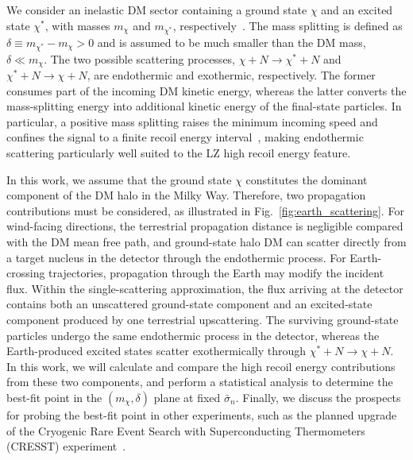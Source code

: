 \documentclass[aps,twocolumn,prl,showpacs,showkeys,preprintnumbers,superscriptaddress,nobibnotes,floatfix,nofootinbib]{revtex4-2}
\begin{document}
We consider an inelastic DM sector containing a ground state  $\chi$ and an excited state $\chi^\ast$, with masses $m_\chi$ and $m_{\chi^\ast}$, respectively~\cite{Tucker-Smith:2001myb,Tucker-Smith:2004mxa,Chang:2008gd,Cui:2009xq,Graham:2010ca,Barello:2014uda,Blennow:2015hzp,PandaX-II:2017zex,Baryakhtar:2020rwy,He:2020wjs,Choi:2020ysq,Bell:2021xff,Song:2021yar,Li:2022acp,XENON:2022avm,Eby:2023wem,Garcia:2024uwf}. The mass splitting is defined as $\delta \equiv m_{\chi^\ast}-m_\chi > 0$ and is assumed to be much smaller than the DM mass, $\delta \ll m_{\chi}$. The two possible scattering processes, $\chi+N\rightarrow\chi^\ast+N$ and $\chi^\ast+N\rightarrow\chi+N$, are endothermic and exothermic, respectively. The former consumes part of the incoming DM kinetic energy, whereas the latter converts the mass-splitting energy into additional kinetic energy of the final-state particles. In particular, a positive mass splitting raises the minimum incoming speed and confines the signal to a finite recoil energy interval~\cite{Bramante:2016rdh,PICO:2023uff,An:2025bby,Alloni:2026xdf}, making endothermic scattering particularly well suited to the LZ high recoil energy feature.

In this work, we assume that the ground state $\chi$ constitutes the dominant component of the DM halo in the Milky Way.  Therefore, two propagation contributions must be considered, as illustrated in Fig.~\ref{fig:earth_scattering}. For wind-facing directions, the terrestrial propagation distance is negligible compared with the DM mean free path, and ground-state halo DM can scatter directly from a target nucleus in the detector through the endothermic process. For Earth-crossing trajectories, propagation through the Earth may modify the incident flux. Within the single-scattering approximation, the flux arriving at the detector contains both an unscattered ground-state component and an excited-state component produced by one terrestrial upscattering. The surviving ground-state particles undergo the same endothermic process in the detector, whereas the Earth-produced excited states scatter exothermically through $\chi^\ast+N\to\chi+N$. In this work, we will calculate and compare the high recoil energy contributions from these two components, and perform a statistical analysis to determine the best-fit point in the $(m_\chi,\delta)$ plane at fixed $\bar{\sigma}_n$. Finally, we discuss the prospects for probing the best-fit point in other experiments, such as the planned upgrade of the Cryogenic Rare Event Search with
Superconducting Thermometers (CRESST) experiment~\cite{Angloher:2025fzw}.
\end{document}
